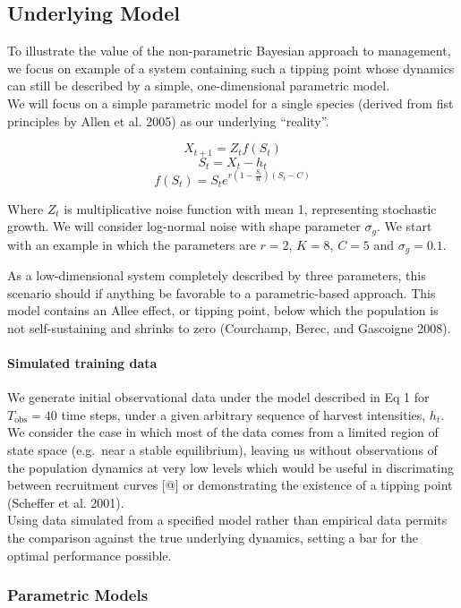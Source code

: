 \documentclass[author-year, review]{elsarticle} %
\begin{document}
\subsection{Underlying Model}\label{underlying-model}

To illustrate the value of the non-parametric Bayesian approach to
management, we focus on example of a system containing such a tipping
point whose dynamics can still be described by a simple, one-dimensional
parametric model.\\We will focus on a simple parametric model for a
single species (derived from fist principles by Allen et al. 2005) as
our underlying ``reality''.

\[X_{t+1} = Z_t f(S_t)  \] \[S_t = X_t - h_t \]
\[f(S_t) = S_t e^{r \left(1 - \frac{S_t}{K}\right)\left(S_t - C\right)} \]

Where $Z_t$ is multiplicative noise function with mean 1, representing
stochastic growth. We will consider log-normal noise with shape
parameter $\sigma_g$. We start with an example in which the parameters
are $r =2$, $K=8$, $C=5$ and $\sigma_g = 0.1$.

As a low-dimensional system completely described by three parameters,
this scenario should if anything be favorable to a parametric-based
approach. This model contains an Allee effect, or tipping point, below
which the population is not self-sustaining and shrinks to zero
(Courchamp, Berec, and Gascoigne 2008).

\paragraph{Simulated training data}\label{simulated-training-data}

We generate initial observational data under the model described in Eq 1
for $T_{\textrm{obs}}=40$ time steps, under a given arbitrary sequence
of harvest intensities, $h_t$. We consider the case in which most of the
data comes from a limited region of state space (e.g.~near a stable
equilibrium), leaving us without observations of the population dynamics
at very low levels which would be useful in discrimating between
recruitment curves {[}@{]} or demonstrating the existence of a tipping
point (Scheffer et al. 2001).\\Using data simulated from a specified
model rather than empirical data permits the comparison against the true
underlying dynamics, setting a bar for the optimal performance possible.

\subsubsection{Parametric Models}\label{parametric-models-1}
\end{document}
